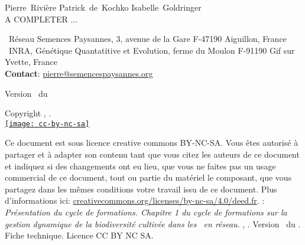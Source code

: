 
\begin{center}
\vfill
\normalsize
Pierre~Rivière \hspace{.5cm}
Patrick~de~Kochko \hspace{.5cm}
Isabelle~Goldringer \\
A COMPLETER ...
\small
\end{center}
\noindent{}~Réseau Semences Paysannes, 3, avenue de la Gare F-47190 Aiguillon, France \\
\noindent{}~INRA, Génétique Quantatitive et Evolution, ferme du Moulon F-91190 Gif sur Yvette, France \\
\noindent\up{*} \textbf{Contact}: \href{mailto:pierre@semencespaysannes.org}{\textcolor{mln-green} {pierre@semencespaysannes.org}}

\vfill

\begin{center}
\large Version \versionCF~du \dateversionCF
\end{center}

\vfill
\normalsize
\begin{center}
Copyright \RSP, \INRA.
~\\
\href{http://creativecommons.org/licenses/by-nc-sa/4.0/deed.fr}{\texttt{[image: cc-by-nc-sa]}}
\end{center}
\small
Ce document est sous licence creative commons BY-NC-SA.
Vous êtes autorisé à partager et à adapter son contenu tant 
que vous citez les auteurs de ce document et indiquez si des changements ont eu lieu, 
que vous ne faites pas un usage commercial de ce document, tout ou partie du matériel le composant,
que vous partagez dans les mêmes conditions votre travail issu de ce document. 
Plus d'informations ici: \url{creativecommons.org/licenses/by-nc-sa/4.0/deed.fr}.
\vfill
{}:
\textit{
Présentation du cycle de formations.
Chapitre 1 du cycle de formations sur la gestion dynamique de la biodiversité cultivée dans les \MSPs~en réseau}.
\RSP, \INRA.
Version \versionCF~du \dateversionCF.
Fiche technique.
Licence CC BY NC SA.

\newpage

